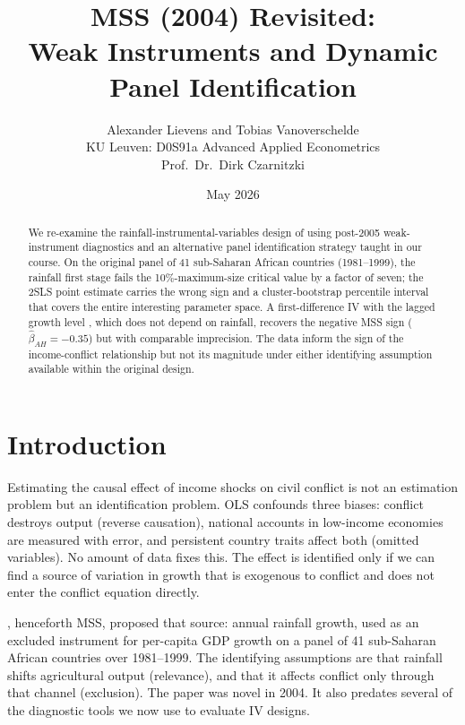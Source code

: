 \documentclass[11pt,a4paper]{article}
\title{\textbf{MSS (2004) Revisited:\\
       Weak Instruments and Dynamic Panel Identification}}
\author{Alexander Lievens and Tobias Vanoverschelde\\
\small KU Leuven: D0S91a Advanced Applied Econometrics\\
\small Prof.\ Dr.\ Dirk Czarnitzki}
\date{May 2026}
\begin{document}
\maketitle

\begin{abstract}
\noindent
We re-examine the rainfall-instrumental-variables design of
\citet{MSS2004} using post-2005 weak-instrument diagnostics and an
alternative panel identification strategy taught in our course. On the
original panel of 41 sub-Saharan African countries (1981--1999), the
rainfall first stage fails the \citet{StockYogo2005} 10\%-maximum-size
critical value by a factor of seven; the 2SLS point estimate carries
the wrong sign and a cluster-bootstrap percentile interval that
covers the entire interesting parameter space. A first-difference IV
with the lagged growth level \citep{AndersonHsiao1981}, which does not
depend on rainfall, recovers the negative MSS sign ($\hat\beta_{AH} =
-0.35$) but with comparable imprecision. The data inform the sign of
the income-conflict relationship but not its magnitude under either
identifying assumption available within the original design.
\end{abstract}

\section{Introduction}\label{sec:intro}
Estimating the causal effect of income shocks on civil conflict is
not an estimation problem but an identification problem. OLS confounds
three biases: conflict destroys output (reverse causation), national
accounts in low-income economies are measured with error, and
persistent country traits affect both (omitted variables). No amount
of data fixes this. The effect is identified only if we can find a
source of variation in growth that is exogenous to conflict and does
not enter the conflict equation directly.

\citet{MSS2004}, henceforth MSS, proposed that source: annual rainfall
growth, used as an excluded instrument for per-capita GDP growth on a
panel of 41 sub-Saharan African countries over 1981--1999. The
identifying assumptions are that rainfall shifts agricultural output
(relevance), and that it affects conflict only through that channel
(exclusion). The paper was novel in 2004. It also predates several of
the diagnostic tools we now use to evaluate IV designs.
\end{document}
